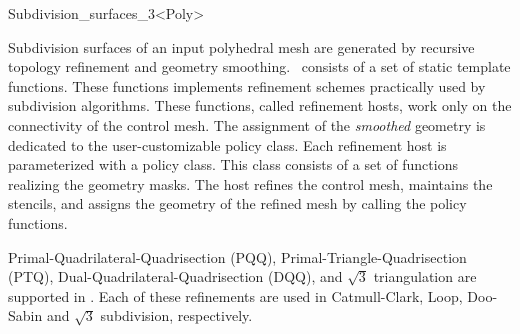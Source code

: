 
\ccRefPageBegin



\begin{ccRefClass}{Subdivision_surfaces_3<Poly>}

\ccDefinition

Subdivision surfaces of an input polyhedral mesh
are generated by recursive topology refinement and geometry
smoothing. \ccClassTemplateName\ consists of a set of static 
template functions. These functions implements refinement schemes 
practically used by subdivision algorithms. These functions,
called refinement hosts, work only on the connectivity of the
control mesh. The assignment of
the \emph{smoothed} geometry is dedicated to the user-customizable
policy class. Each refinement host is parameterized with a 
policy class. This class consists of a set of functions realizing
the geometry masks. 
The host refines the control mesh, maintains the stencils, and assigns the 
geometry of the refined mesh by calling the policy functions.

Primal-Quadrilateral-Quadrisection (PQQ), Primal-Triangle-Quadrisection 
(PTQ), Dual-Quadrilateral-Quadrisection (DQQ), and $\sqrt{3}$ triangulation
are supported in \ccClassTemplateName . Each of these refinements are used in 
Catmull-Clark, Loop, Doo-Sabin and $\sqrt{3}$ subdivision, respectively. 



\end{ccRefClass}
